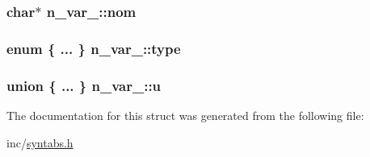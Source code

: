 \subsubsection[{\texorpdfstring{nom}{nom}}]{\setlength{\rightskip}{0pt plus 5cm}char$\ast$ n\+\_\+var\+\_\+\+::nom}\hypertarget{structn__var___a660e3d28fd5c847b70b755f20365d5f1}{}\label{structn__var___a660e3d28fd5c847b70b755f20365d5f1}
\subsubsection[{\texorpdfstring{type}{type}}]{\setlength{\rightskip}{0pt plus 5cm}enum \{ ... \}   n\+\_\+var\+\_\+\+::type}\hypertarget{structn__var___aa31a9a12b79f3948485ad279dc9acb18}{}\label{structn__var___aa31a9a12b79f3948485ad279dc9acb18}
\subsubsection[{\texorpdfstring{u}{u}}]{\setlength{\rightskip}{0pt plus 5cm}union \{ ... \}  n\+\_\+var\+\_\+\+::u}\hypertarget{structn__var___aef779b93782db721a635e1da0b8e61f2}{}\label{structn__var___aef779b93782db721a635e1da0b8e61f2}


The documentation for this struct was generated from the following file\+:\begin{DoxyCompactItemize}
\item 
inc/\hyperlink{syntabs_8h}{syntabs.\+h}\end{DoxyCompactItemize}
